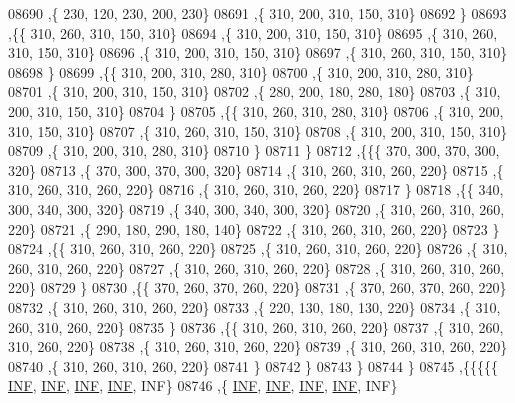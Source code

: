 \begin{DoxyCode}
08690     ,\{   230,   120,   230,   200,   230\}
08691     ,\{   310,   200,   310,   150,   310\}
08692     \}
08693    ,\{\{   310,   260,   310,   150,   310\}
08694     ,\{   310,   200,   310,   150,   310\}
08695     ,\{   310,   260,   310,   150,   310\}
08696     ,\{   310,   200,   310,   150,   310\}
08697     ,\{   310,   260,   310,   150,   310\}
08698     \}
08699    ,\{\{   310,   200,   310,   280,   310\}
08700     ,\{   310,   200,   310,   280,   310\}
08701     ,\{   310,   200,   310,   150,   310\}
08702     ,\{   280,   200,   180,   280,   180\}
08703     ,\{   310,   200,   310,   150,   310\}
08704     \}
08705    ,\{\{   310,   260,   310,   280,   310\}
08706     ,\{   310,   200,   310,   150,   310\}
08707     ,\{   310,   260,   310,   150,   310\}
08708     ,\{   310,   200,   310,   150,   310\}
08709     ,\{   310,   200,   310,   280,   310\}
08710     \}
08711    \}
08712   ,\{\{\{   370,   300,   370,   300,   320\}
08713     ,\{   370,   300,   370,   300,   320\}
08714     ,\{   310,   260,   310,   260,   220\}
08715     ,\{   310,   260,   310,   260,   220\}
08716     ,\{   310,   260,   310,   260,   220\}
08717     \}
08718    ,\{\{   340,   300,   340,   300,   320\}
08719     ,\{   340,   300,   340,   300,   320\}
08720     ,\{   310,   260,   310,   260,   220\}
08721     ,\{   290,   180,   290,   180,   140\}
08722     ,\{   310,   260,   310,   260,   220\}
08723     \}
08724    ,\{\{   310,   260,   310,   260,   220\}
08725     ,\{   310,   260,   310,   260,   220\}
08726     ,\{   310,   260,   310,   260,   220\}
08727     ,\{   310,   260,   310,   260,   220\}
08728     ,\{   310,   260,   310,   260,   220\}
08729     \}
08730    ,\{\{   370,   260,   370,   260,   220\}
08731     ,\{   370,   260,   370,   260,   220\}
08732     ,\{   310,   260,   310,   260,   220\}
08733     ,\{   220,   130,   180,   130,   220\}
08734     ,\{   310,   260,   310,   260,   220\}
08735     \}
08736    ,\{\{   310,   260,   310,   260,   220\}
08737     ,\{   310,   260,   310,   260,   220\}
08738     ,\{   310,   260,   310,   260,   220\}
08739     ,\{   310,   260,   310,   260,   220\}
08740     ,\{   310,   260,   310,   260,   220\}
08741     \}
08742    \}
08743   \}
08744  \}
08745 ,\{\{\{\{\{   \hyperlink{energy__const_8h_a12c2040f25d8e3a7b9e1c2024c618cb6}{INF},   \hyperlink{energy__const_8h_a12c2040f25d8e3a7b9e1c2024c618cb6}{INF},   \hyperlink{energy__const_8h_a12c2040f25d8e3a7b9e1c2024c618cb6}{INF},   \hyperlink{energy__const_8h_a12c2040f25d8e3a7b9e1c2024c618cb6}{INF},   INF\}
08746     ,\{   \hyperlink{energy__const_8h_a12c2040f25d8e3a7b9e1c2024c618cb6}{INF},   \hyperlink{energy__const_8h_a12c2040f25d8e3a7b9e1c2024c618cb6}{INF},   \hyperlink{energy__const_8h_a12c2040f25d8e3a7b9e1c2024c618cb6}{INF},   \hyperlink{energy__const_8h_a12c2040f25d8e3a7b9e1c2024c618cb6}{INF},   INF\}

\end{DoxyCode}
